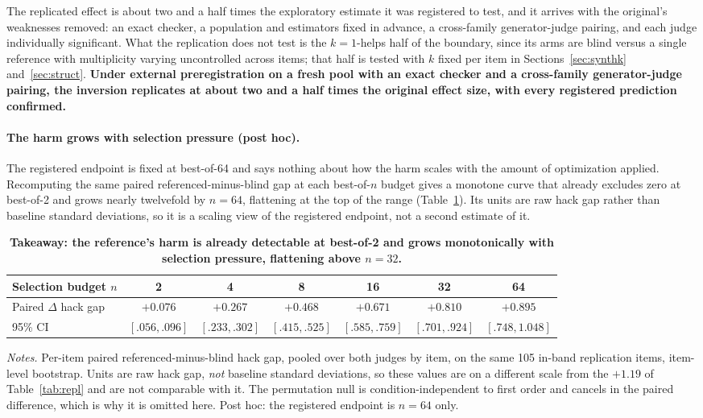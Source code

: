 \documentclass[11pt]{article}
\begin{document}
The replicated effect is about two and a half times the exploratory estimate it was registered to test, and it arrives with the original's weaknesses removed: an exact checker, a population and estimators fixed in advance, a cross-family generator-judge pairing, and each judge individually significant.
What the replication does not test is the $k{=}1$-helps half of the boundary, since its arms are blind versus a single reference with multiplicity varying uncontrolled across items; that half is tested with $k$ fixed per item in Sections~\ref{sec:synthk} and~\ref{sec:struct}.
\textbf{Under external preregistration on a fresh pool with an exact checker and a cross-family generator-judge pairing, the inversion replicates at about two and a half times the original effect size, with every registered prediction confirmed.}

\paragraph{The harm grows with selection pressure (post hoc).}
The registered endpoint is fixed at best-of-64 and says nothing about how the harm scales with the amount of optimization applied.
Recomputing the same paired referenced-minus-blind gap at each best-of-$n$ budget gives a monotone curve that already excludes zero at best-of-2 and grows nearly twelvefold by $n{=}64$, flattening at the top of the range (Table~\ref{tab:pressure}).
Its units are raw hack gap rather than baseline standard deviations, so it is a scaling view of the registered endpoint, not a second estimate of it.

\begin{table}[tbp]
\centering
\small
\setlength{\tabcolsep}{5pt}
\begin{tabular}{lcccccc}
\toprule
Selection budget $n$ & 2 & 4 & 8 & 16 & 32 & 64 \\
\midrule
Paired $\Delta$ hack gap & $+0.076$ & $+0.267$ & $+0.468$ & $+0.671$ & $+0.810$ & $+0.895$ \\
95\% CI & {\scriptsize$[.056, .096]$} & {\scriptsize$[.233, .302]$} & {\scriptsize$[.415, .525]$} & {\scriptsize$[.585, .759]$} & {\scriptsize$[.701, .924]$} & {\scriptsize$[.748, 1.048]$} \\
\bottomrule
\end{tabular}

\medskip
\begin{minipage}{0.97\textwidth}
\footnotesize
\emph{Notes.}
Per-item paired referenced-minus-blind hack gap, pooled over both judges by item, on the same 105 in-band replication items, item-level bootstrap.
Units are raw hack gap, \emph{not} baseline standard deviations, so these values are on a different scale from the $+1.19$ of Table~\ref{tab:repl} and are not comparable with it.
The permutation null is condition-independent to first order and cancels in the paired difference, which is why it is omitted here.
Post hoc: the registered endpoint is $n{=}64$ only.
\end{minipage}
\caption{\textbf{Takeaway: the reference's harm is already detectable at best-of-2 and grows monotonically with selection pressure, flattening above $n{=}32$.}}
\label{tab:pressure}
\end{table}
\end{document}

